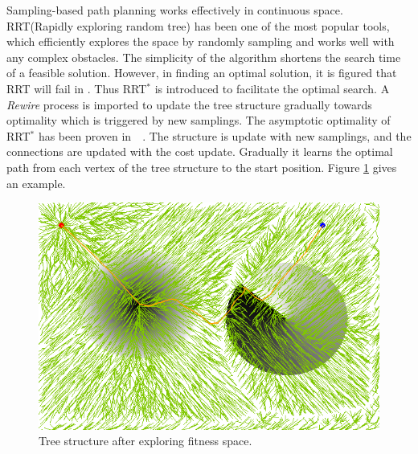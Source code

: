 \documentclass[conference]{IEEEtran}
\begin{document}
Sampling-based path planning works effectively in continuous space.
RRT(Rapidly exploring random tree) has been one of the most popular tools, which  efficiently explores the space by randomly sampling and works well with any complex obstacles.
The simplicity of the algorithm shortens the search time of a feasible solution.
However, in finding an optimal solution, it is figured that RRT will fail in \cite{Karaman.Frazzoli:RSS10}.
Thus RRT$^{*}$ is introduced to facilitate the optimal search.
A \emph{Rewire} process is imported to update the tree structure gradually towards optimality which is triggered by new samplings.
The asymptotic optimality of RRT$^{*}$ has been proven in~\cite{Karaman.Frazzoli:RSS10}~\cite{Karaman:2011:SAO:2000201.2000209}.
The structure is update with new samplings, and the connections are updated with the cost update.
Gradually it learns the optimal path from each vertex of the tree structure to the start position.
Figure \ref{fig:RRTstar2} gives an example.
\begin{figure}
\centering
\includegraphics[width=0.9\linewidth]{fig/RRTstar2}
\caption{Tree structure after exploring fitness space.}
\label{fig:RRTstar2}
\end{figure}
\end{document}
